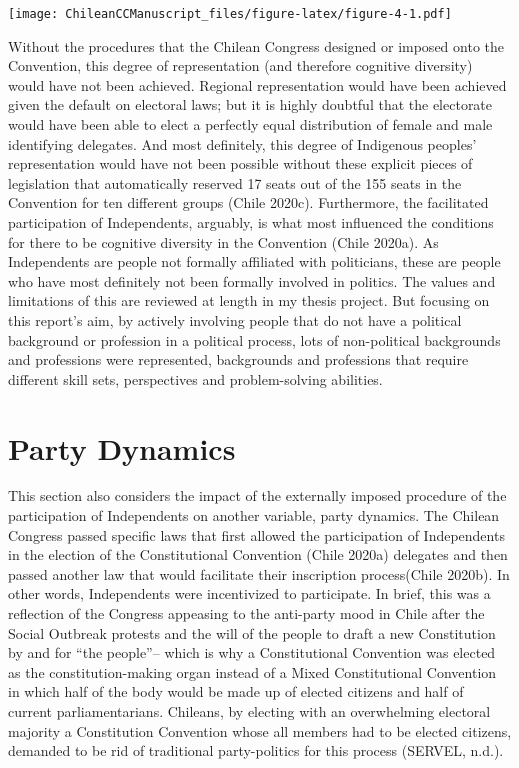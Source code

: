 \documentclass[
]{article}
\begin{document}
\texttt{[image: ChileanCCManuscript\_files/figure-latex/figure-4-1.pdf]}

Without the procedures that the Chilean Congress designed or imposed
onto the Convention, this degree of representation (and therefore
cognitive diversity) would have not been achieved. Regional
representation would have been achieved given the default on electoral
laws; but it is highly doubtful that the electorate would have been able
to elect a perfectly equal distribution of female and male identifying
delegates. And most definitely, this degree of Indigenous peoples'
representation would have not been possible without these explicit
pieces of legislation that automatically reserved 17 seats out of the
155 seats in the Convention for ten different groups (Chile 2020c).
Furthermore, the facilitated participation of Independents, arguably, is
what most influenced the conditions for there to be cognitive diversity
in the Convention (Chile 2020a). As Independents are people not formally
affiliated with politicians, these are people who have most definitely
not been formally involved in politics. The values and limitations of
this are reviewed at length in my thesis project. But focusing on this
report's aim, by actively involving people that do not have a political
background or profession in a political process, lots of non-political
backgrounds and professions were represented, backgrounds and
professions that require different skill sets, perspectives and
problem-solving abilities.

\hypertarget{party-dynamics}{%
\section{Party Dynamics}\label{party-dynamics}}

This section also considers the impact of the externally imposed
procedure of the participation of Independents on another variable,
party dynamics. The Chilean Congress passed specific laws that first
allowed the participation of Independents in the election of the
Constitutional Convention (Chile 2020a) delegates and then passed
another law that would facilitate their inscription process(Chile
2020b). In other words, Independents were incentivized to participate.
In brief, this was a reflection of the Congress appeasing to the
anti-party mood in Chile after the Social Outbreak protests and the will
of the people to draft a new Constitution by and for ``the people''--
which is why a Constitutional Convention was elected as the
constitution-making organ instead of a Mixed Constitutional Convention
in which half of the body would be made up of elected citizens and half
of current parliamentarians. Chileans, by electing with an overwhelming
electoral majority a Constitution Convention whose all members had to be
elected citizens, demanded to be rid of traditional party-politics for
this process (SERVEL, n.d.).
\end{document}
